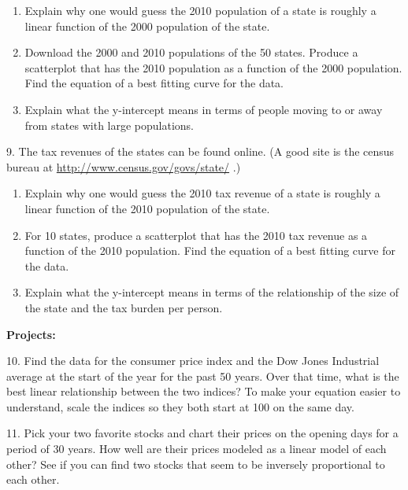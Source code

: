 \documentclass[10pt,]{book}
\newcommand{\terminology}[1]{\textbf{#1}}
\theoremstyle{plain}
\theoremstyle{definition}
\theoremstyle{definition}
\begin{document}
\begin{exerciselist}
%
\leavevmode%
\begin{enumerate}[label=(\alph*)]
\item\hypertarget{li-95}{} Explain why one would guess the 2010 population of a state is roughly a linear function of the 2000 population of the state.%
\item\hypertarget{li-96}{} Download the 2000 and 2010 populations of the 50 states.  Produce a scatterplot that has the 2010 population as a function of the 2000 population.  Find the equation of a best fitting curve for the data.%
\item\hypertarget{li-97}{} Explain what the y-intercept means in terms of people moving to or away from states with large populations.%
\end{enumerate}
\par\smallskip
\item[9.]\hypertarget{exercise-72}{}  The tax revenues of the states can be found online.  (A good site is the census bureau at 
\href{http://www.census.gov/govs/state/}{http://www.census.gov/govs/state/}
.)
%
\leavevmode%
\begin{enumerate}[label=(\alph*)]
\item\hypertarget{li-98}{} Explain why one would guess the 2010 tax revenue of a state is roughly a linear function of the 2010 population of the state.%
\item\hypertarget{li-99}{} For 10 states, produce a scatterplot that has the 2010 tax revenue as a function of the 2010 population.  Find the equation of a best fitting curve for the data.%
\item\hypertarget{li-100}{} Explain what the y-intercept means in terms of the relationship of the size of the state and the tax burden per person.%
\end{enumerate}
\par\smallskip
\par
\terminology{Projects:}%
\item[10.]\hypertarget{exercise-73}{}  Find the data for the consumer price index and the Dow Jones Industrial average at the start of the year for the past 50 years.  Over that time, what is the best linear relationship between the two indices?  To make your equation easier to understand, scale the indices so they both start at 100 on the same day.
%
\par\smallskip
\item[11.]\hypertarget{exercise-74}{}  Pick your two favorite stocks and chart their prices on the opening days for a period of 30 years.  How well are their prices modeled as a linear model of each other?  See if you can find two stocks that seem to be inversely proportional to each other.
%
\par\smallskip
\end{exerciselist}
\typeout{************************************************}
\typeout{************************************************}
\end{document}
